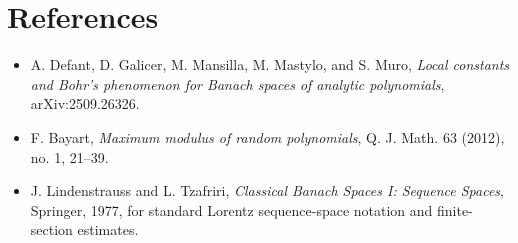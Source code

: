 \documentclass[11pt]{article}
\begin{document}
\section*{References}

\begin{itemize}[leftmargin=*]
\item A. Defant, D. Galicer, M. Mansilla, M. Mastylo, and S. Muro,
\emph{Local constants and Bohr's phenomenon for Banach spaces of analytic
polynomials}, arXiv:2509.26326.
\item F. Bayart, \emph{Maximum modulus of random polynomials}, Q. J. Math.
63 (2012), no. 1, 21--39.
\item J. Lindenstrauss and L. Tzafriri, \emph{Classical Banach Spaces I:
Sequence Spaces}, Springer, 1977, for standard Lorentz sequence-space
notation and finite-section estimates.
\end{itemize}
\end{document}
